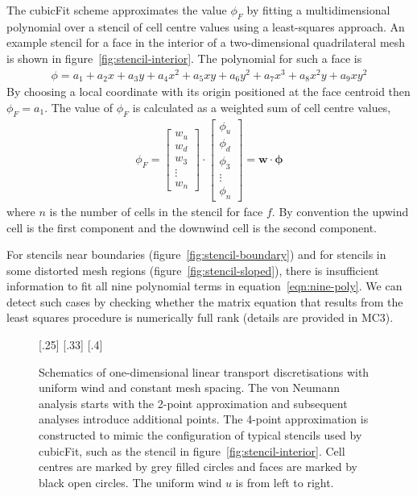 \documentclass[a4paper,11pt]{article}
\begin{document}
The cubicFit scheme approximates the value $\phi_F$ by fitting a multidimensional polynomial over a stencil of cell centre values using a least-squares approach.  An example stencil for a face in the interior of a two-dimensional quadrilateral mesh is shown in figure~\ref{fig:stencil-interior}.
The polynomial for such a face is
\begin{align}
	\phi = a_1 + a_2 x + a_3 y + a_4 x^2 + a_5 xy + a_6 y^2 + a_7 x^3 + a_8 x^2 y + a_9 x y^2 \label{eqn:nine-poly}
\end{align}
By choosing a local coordinate with its origin positioned at the face centroid then $\phi_F = a_1$.  The value of $\phi_F$ is calculated as a weighted sum of cell centre values,
\begin{align}
	\phi_F = \begin{bmatrix}w_u \\ w_d \\ w_3 \\ \vdots \\ w_n\end{bmatrix} \cdot
		\begin{bmatrix}\phi_u \\ \phi_d \\ \phi_3 \\ \vdots \\ \phi_n\end{bmatrix}
	= \mathbf{w} \cdot \bm{\phi}
\end{align}
where $n$ is the number of cells in the stencil for face $f$.  By convention the upwind cell is the first component and the downwind cell is the second component.

For stencils near boundaries (figure~\ref{fig:stencil-boundary}) and for stencils in some distorted mesh regions (figure~\ref{fig:stencil-sloped}), there is insufficient information to fit all nine polynomial terms in equation~\eqref{eqn:nine-poly}.  We can detect such cases by checking whether the matrix equation that results from the least squares procedure is numerically full rank (details are provided in MC3).

\begin{figure}
	\centering
	[.25\linewidth]{}
	[.33\linewidth]{}
	[.4\linewidth]{}
	\caption{Schematics of one-dimensional linear transport discretisations with uniform wind and constant mesh spacing.  The von Neumann analysis starts with the 2-point approximation and subsequent analyses introduce additional points.  The 4-point approximation is constructed to mimic the configuration of typical stencils used by cubicFit, such as the stencil in figure~\ref{fig:stencil-interior}.  Cell centres are marked by grey filled circles and faces are marked by black open circles.  The uniform wind $u$ is from left to right.}
	\label{fig:vonNeumann}
\end{figure}
\end{document}
